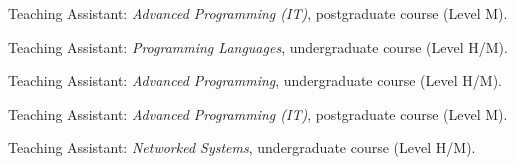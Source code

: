 \begin{cvitemize}[2017--2018]
	\item Teaching Assistant: \emph{Advanced Programming (IT)}, postgraduate course (Level M).
\end{cvitemize}
\clearpage
{}
\begin{cvitemize}[2016--2017]
	\item Teaching Assistant: \emph{Programming Languages}, undergraduate course (Level H/M).
	\item Teaching Assistant: \emph{Advanced Programming}, undergraduate course (Level H/M).
	\item Teaching Assistant: \emph{Advanced Programming (IT)}, postgraduate course (Level M).
	\item Teaching Assistant: \emph{Networked Systems}, undergraduate course (Level H/M).
\end{cvitemize}